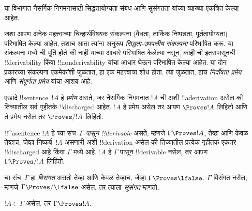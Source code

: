 \documentclass[../../../include/open-logic-section]{subfiles}
\begin{document}
      {}
      {}


\begin{editorial}
या विभागात नैसर्गिक निगमनासाठी सिद्धतायोग्यता संबंध आणि सुसंगतता यांच्या
व्याख्या एकत्रित केल्या आहेत.
\end{editorial}

\begin{explain}
जशा आपण अनेक महत्त्वाच्या चिन्हार्थविषयक संकल्पना (वैधता, तार्किक निष्पन्नता,
पूर्ततायोग्यता) परिभाषित केल्या आहेत, तशाच आता त्यांना अनुरूप
\emph{सिद्धता-उपपत्तीय संकल्पना} परिभाषित करू. या संकल्पना मध्ये
ची पूर्ति होते की नाही याच्या आधारे परिभाषित केलेल्या नसून,
काही ची इतरांपासूनची !!{derivability} किंवा
!!{nonderivability} यांचा आधार घेऊन परिभाषित केल्या आहेत. या दोन प्रकारच्या
संकल्पना एकमेकांशी जुळतात, हा एक महत्त्वाचा शोध होता. त्या जुळतात, हाच
\emph{निर्दोषता प्रमेय} आणि \emph{संपूर्णता प्रमेय} यांचा आशय आहे.
\end{explain}


\begin{defn}[प्रमेये]
एखादे !!{sentence}~$!A$ हे \emph{प्रमेय} असते, जर नैसर्गिक निगमनात $!A$ ची
अशी !!a{derivation} असेल की तिच्यातील सर्व गृहीतके !!{discharged} आहेत.
$!A$ हे प्रमेय असेल तर आपण $\Proves !A$ लिहितो आणि ते प्रमेय नसेल तर
$\Proves/ !A$ लिहितो.
\end{defn}

\begin{defn}[!!^{derivability}]
!!^a{sentence} $!A$ हे च्या संच~$\Gamma$ \emph{पासून
!!{derivable}} असते, म्हणजे $\Gamma \Proves !A$, तेव्हा आणि केवळ तेव्हाच,
जेव्हा निष्कर्ष~$!A$ असणारी अशी !!{derivation} असेल की तिच्यातील प्रत्येक
गृहीतक एकतर !!{discharged} आहे किंवा $\Gamma$ मध्ये आहे. $!A$ हे $\Gamma$
पासून !!{derivable} नसेल, तर आपण $\Gamma \Proves/ !A$ लिहितो.
\end{defn}

\begin{defn}[सुसंगतता]
चा संच~$\Gamma$ हा \emph{विसंगत} असतो तेव्हा आणि केवळ तेव्हाच,
जेव्हा $\Gamma \Proves \lfalse$. $\Gamma$ विसंगत नसेल, म्हणजे
$\Gamma \Proves/ \lfalse$ असेल, तर त्याला \emph{सुसंगत} म्हणतो.
\end{defn}

\begin{prop}[परावर्तिता]
$!A \in \Gamma$ असेल, तर $\Gamma \Proves !A$.
\end{prop}
\end{document}
